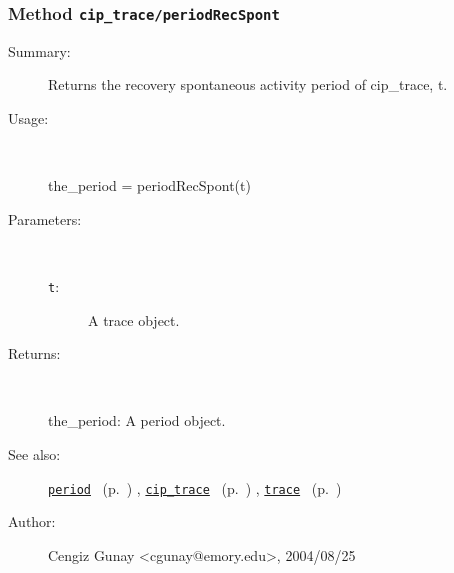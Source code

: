 \subsubsection[Method \texttt{periodRecSpont}]{Method \texttt{cip\_trace/periodRecSpont}}%
%
\label{ref_cip_trace__periodRecSpont}%
\hypertarget{ref_cip_trace__periodRecSpont}{}%
\begin{description}
\item[Summary:]Returns the recovery spontaneous activity period 
		of cip\_trace, t. 
%
\item[Usage:]~%
\begin{lyxcode}%
the\_period = periodRecSpont(t)
%
\end{lyxcode}%
%
%
\item[Parameters:]~
\begin{description}%
\item[\texttt{t}:]
 A trace object.
\end{description}%
%
\item[Returns:
]~

	the\_period: A period object.
%
%
\item[See also:]%
\hyperlink{ref_period}{\texttt{period}}%
\ (p.~\pageref{ref_period})%
%
, \hyperlink{ref_cip_trace}{\texttt{cip\_trace}}%
\ (p.~\pageref{ref_cip_trace})%
%
, \hyperlink{ref_trace}{\texttt{trace}}%
\ (p.~\pageref{ref_trace})%
%
%
\item[Author:]%
Cengiz Gunay <cgunay@emory.edu>, 2004/08/25
%
\end{description}
\methodline%
